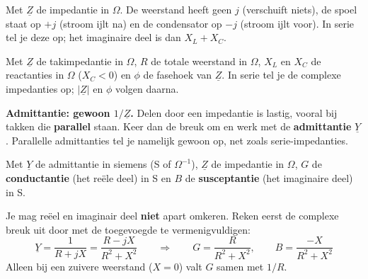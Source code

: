 \documentclass[a4paper,11pt]{article}
\begin{document}


{Met $\underline{Z}$ de impedantie in $\Omega$. De weerstand heeft geen $j$ (verschuift niets), de
    spoel staat op $+j$ (stroom ijlt na) en de condensator op $-j$ (stroom ijlt voor). In serie tel
    je deze op; het imaginaire deel is dan $X_L + X_C$.}

{Met $\underline{Z}$ de takimpedantie in $\Omega$, $R$ de totale weerstand in $\Omega$, $X_L$ en $X_C$
    de reactanties in $\Omega$ ($X_C < 0$) en $\phi$ de fasehoek van $\underline{Z}$. In serie tel je
    de complexe impedanties op; $|\underline{Z}|$ en $\phi$ volgen daarna.}

\textbf{Admittantie: gewoon $1/\underline{Z}$.} Delen door een impedantie is lastig, vooral bij
takken die \textbf{parallel} staan. Keer dan de breuk om en werk met de \textbf{admittantie}
$\underline{Y}$. Parallelle admittanties tel je namelijk gewoon op, net zoals serie-impedanties.

{Met $\underline{Y}$ de admittantie in siemens (S of $\Omega^{-1}$), $\underline{Z}$ de impedantie in
    $\Omega$, $G$ de \textbf{conductantie} (het re\"ele deel) in S en $B$ de \textbf{susceptantie}
    (het imaginaire deel) in S.}

\begin{waarschuwing}
    Je mag re\"eel en imaginair deel \textbf{niet} apart omkeren. Reken eerst de complexe breuk uit
    door met de toegevoegde te vermenigvuldigen:
    \[\underline{Y} = \frac{1}{R+jX} = \frac{R-jX}{R^2+X^2}
        \qquad\Longrightarrow\qquad
        G = \frac{R}{R^2+X^2}, \qquad B = \frac{-X}{R^2+X^2}\]
    Alleen bij een zuivere weerstand ($X=0$) valt $G$ samen met $1/R$.
\end{waarschuwing}
\end{document}
